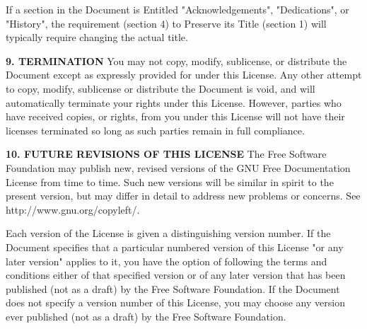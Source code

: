 If a section in the Document is Entitled "Acknowledgements", "Dedications", or "History", the requirement (section 4) to Preserve its Title (section 1) will typically require changing the actual title. 

\textbf{9. TERMINATION}
You may not copy, modify, sublicense, or distribute the Document except as expressly provided for under this License. Any other attempt to copy, modify, sublicense or distribute the Document is void, and will automatically terminate your rights under this License. However, parties who have received copies, or rights, from you under this License will not have their licenses terminated so long as such parties remain in full compliance.

\textbf{10. FUTURE REVISIONS OF THIS LICENSE}
The Free Software Foundation may publish new, revised versions of the GNU Free Documentation License from time to time. Such new versions will be similar in spirit to the present version, but may differ in detail to address new problems or concerns. See http://www.gnu.org/copyleft/.

Each version of the License is given a distinguishing version number. If the Document specifies that a particular numbered version of this License "or any later version" applies to it, you have the option of following the terms and conditions either of that specified version or of any later version that has been published (not as a draft) by the Free Software Foundation. If the Document does not specify a version number of this License, you may choose any version ever published (not as a draft) by the Free Software Foundation.
